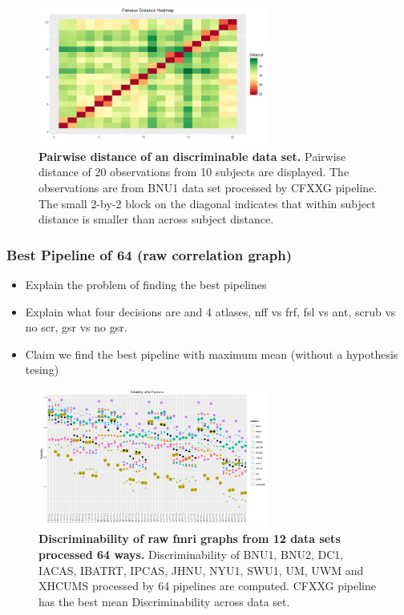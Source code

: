 \documentclass{article}
\begin{document}
\begin{figure}[t!]
\includegraphics[width=3.0in]{../Figs/pairdistance.png}
\caption{{\bf Pairwise distance of an discriminable data set.} Pairwise distance of 20 observations from 10 subjects are displayed. The observations are from BNU1 data set processed by CFXXG pipeline. The small 2-by-2 block on the diagonal indicates that within subject distance is smaller than across subject distance. }
\label{fig:5}
\end{figure}


\subsubsection{Best Pipeline of 64 (raw correlation graph)}
\begin{itemize}
	\item Explain the problem of finding the best pipelines
	\item Explain what four decisions are  and 4 atlases, nff vs frf, fsl vs ant, scrub vs no scr, gsr vs no gsr. 
	\item Claim we find the best pipeline with maximum mean (without a hypothesis tesing)
\end{itemize}

\begin{figure}[t!]
\includegraphics[width=3.0in]{../Figs/64_pipelines_size.png}
\caption{{\bf Discriminability of raw fmri graphs from 12 data sets processed 64 ways.}  Discriminability of BNU1, BNU2, DC1, IACAS, IBATRT, IPCAS, JHNU, NYU1, SWU1, UM, UWM and XHCUMS processed by 64 pipelines are computed. CFXXG pipeline has the best mean Discriminability across data set. }
\label{fig:6}
\end{figure}
\end{document}
